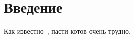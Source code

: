\section{Введение}

Как известно~\cite[гл.~1]{kak_pasti_kotov}, пасти котов очень трудно.

\clearpage